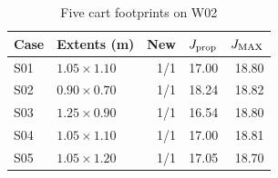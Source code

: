 \begin{table}[!tb]
\centering\caption{Five cart footprints on W02}
\label{tab:shapes}
\footnotesize\begin{tabular}{llrrr}
\toprule
Case & Extents (m) & New & $J_{\rm prop}$ & $J_{\rm MAX}$\\
\midrule
S01 & $1.05\times1.10$ & 1/1 & 17.00 & 18.80\\
S02 & $0.90\times0.70$ & 1/1 & 18.24 & 18.82\\
S03 & $1.25\times0.90$ & 1/1 & 16.54 & 18.80\\
S04 & $1.05\times1.10$ & 1/1 & 17.00 & 18.81\\
S05 & $1.05\times1.20$ & 1/1 & 17.05 & 18.70\\
\bottomrule\end{tabular}
\end{table}
